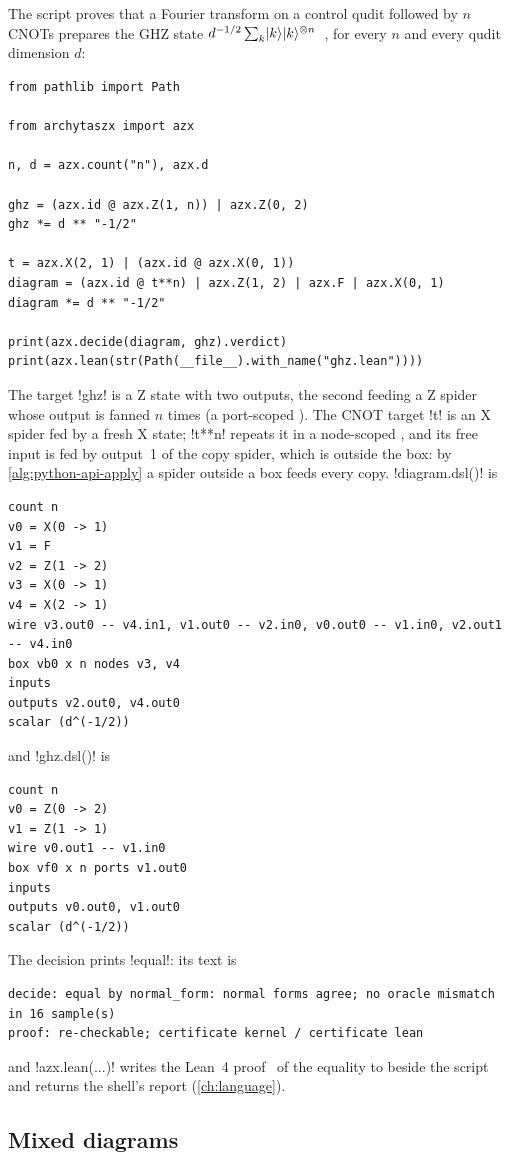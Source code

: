 The script  proves that a Fourier transform on a control qudit followed by $n$ CNOTs prepares the GHZ state $d^{-1/2}\sum_k\lvert k \rangle\lvert k \rangle^{\otimes n}$~\cite{ghz1989beyond}, for every $n$ and every qudit dimension $d$:
\begin{lstlisting}[style=python]
from pathlib import Path

from archytaszx import azx

n, d = azx.count("n"), azx.d

ghz = (azx.id @ azx.Z(1, n)) | azx.Z(0, 2)
ghz *= d ** "-1/2"

t = azx.X(2, 1) | (azx.id @ azx.X(0, 1))
diagram = (azx.id @ t**n) | azx.Z(1, 2) | azx.F | azx.X(0, 1)
diagram *= d ** "-1/2"

print(azx.decide(diagram, ghz).verdict)
print(azx.lean(str(Path(__file__).with_name("ghz.lean"))))
\end{lstlisting}
The target \py!ghz! is a Z state with two outputs, the second feeding a Z spider whose output is fanned $n$ times (a port-scoped \bbox{}). The CNOT target \py!t! is an X spider fed by a fresh X state; \py!t**n! repeats it in a node-scoped \bbox{}, and its free input is fed by output~1 of the copy spider, which is outside the box: by \cref{alg:python-api-apply} a spider outside a box feeds every copy. \py!diagram.dsl()! is
\begin{lstlisting}[style=azx]
count n
v0 = X(0 -> 1)
v1 = F
v2 = Z(1 -> 2)
v3 = X(0 -> 1)
v4 = X(2 -> 1)
wire v3.out0 -- v4.in1, v1.out0 -- v2.in0, v0.out0 -- v1.in0, v2.out1 -- v4.in0
box vb0 x n nodes v3, v4
inputs
outputs v2.out0, v4.out0
scalar (d^(-1/2))
\end{lstlisting}
and \py!ghz.dsl()! is
\begin{lstlisting}[style=azx]
count n
v0 = Z(0 -> 2)
v1 = Z(1 -> 1)
wire v0.out1 -- v1.in0
box vf0 x n ports v1.out0
inputs
outputs v0.out0, v1.out0
scalar (d^(-1/2))
\end{lstlisting}
The decision prints \code!equal!: its text is
\begin{lstlisting}[style=grammar]
decide: equal by normal_form: normal forms agree; no oracle mismatch in 16 sample(s)
proof: re-checkable; certificate kernel / certificate lean
\end{lstlisting}
and \py!azx.lean(...)! writes the Lean~4 proof~\cite{demoura2021lean4} of the equality to  beside the script and returns the shell's report (\cref{ch:language}).

\subsection{Mixed diagrams}

